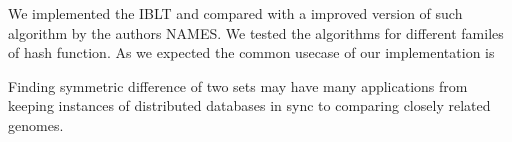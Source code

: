 We implemented the IBLT and compared with a improved version of such algorithm by the authors NAMES. We tested the algorithms for different familes of hash function.
As we expected the common usecase of our implementation is 


Finding symmetric difference of two sets may have many applications from keeping instances of distributed databases in sync to comparing closely related genomes.


